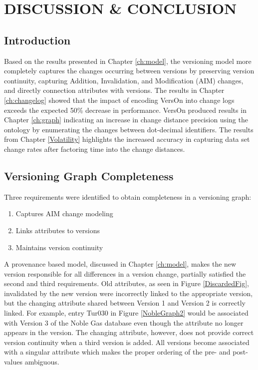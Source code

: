 \chapter{DISCUSSION \& CONCLUSION}

\section{Introduction}

Based on the results presented in Chapter \ref{ch:model}, the versioning model more completely captures the changes occurring between versions by preserving version continuity, capturing Addition, Invalidation, and Modification (AIM) changes, and directly connection attributes with versions.
The results in Chapter \ref{ch:changelog} showed that the impact of encoding VersOn into change logs exceeds the expected 50\% decrease in performance.
VersOn produced results in Chapter \ref{ch:graph} indicating an increase in change distance precision using the ontology by enumerating the changes between dot-decimal identifiers.
The results from Chapter \ref{Volatility} highlights the increased accuracy in capturing data set change rates after factoring time into the change distances.

\section{Versioning Graph Completeness}

Three requirements were identified to obtain completeness in a versioning graph:
\begin{enumerate}
	\item Captures \acrfull{AIM} change modeling
	\item Links attributes to versions
	\item Maintains version continuity
\end{enumerate}
A provenance based model, discussed in Chapter \ref{ch:model}, makes the new version responsible for all differences in a version change, partially satisfied the second and third requirements.
Old attributes, as seen in Figure \ref{DiscardedFig}, invalidated by the new version were incorrectly linked to the appropriate version, but the changing attribute shared between Version 1 and Version 2 is correctly linked.
For example, entry Tur030 in Figure \ref{NobleGraph2} would be associated with Version 3 of the Noble Gas database even though the attribute no longer appears in the version.
The changing attribute, however, does not provide correct version continuity when a third version is added.
All versions become associated with a singular attribute which makes the proper ordering of the pre- and post-values ambiguous.


